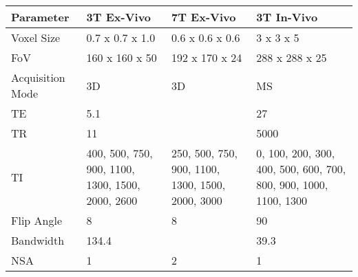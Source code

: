 \begin{table}[H]
	\centering
	\begin{tabularx}{1.0\textwidth}{|X|X|X|X|}
		\hline
		Parameter                            & 3T Ex-Vivo                                         & 7T Ex-Vivo                                         & 3T In-Vivo                                                         \\ \hline
		Voxel Size                           & 0.7 x 0.7 x 1.0                                    & 0.6 x 0.6 x 0.6                                    & 3 x 3 x 5                                                          \\ \hline
		FoV                                  & 160 x 160 x 50                                     & 192 x 170 x 24                                     & 288 x 288 x 25                                                     \\ \hline
		Acquisition Mode                     & 3D                                                 & 3D                                                 & MS                                                                 \\ \hline
		TE                                   & 5.1                                                &                                                    & 27                                                                 \\ \hline
		TR                                   & 11                                                 &                                                    & 5000                                                               \\ \hline
		TI                                   & 400, 500, 750, 900,   1100, 1300, 1500, 2000, 2600 & 250, 500, 750, 900,   1100, 1300, 1500, 2000, 3000 & 0, 100, 200, 300,   400, 500, 600, 700, 800, 900, 1000, 1100, 1300 \\ \hline
		Flip Angle                           & 8                                                  & 8                                                  & 90                                                                 \\ \hline
		Bandwidth                            & 134.4                                              &                                                    & 39.3                                                               \\ \hline
		NSA                                  & 1                                                  & 2                                                  & 1                                                                  \\ \hline

\end{tabularx}
\end{table}
